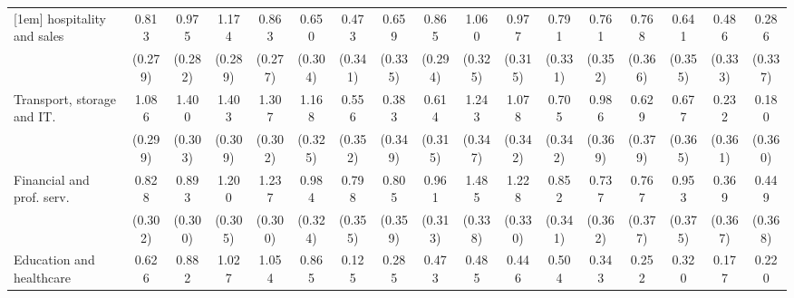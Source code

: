 {\begin{tabular}{l*{16}{c}}
[1em]
hospitality and sales&       0.813\sym{**} &       0.975\sym{***}&       1.174\sym{***}&       0.863\sym{**} &       0.650\sym{*}  &       0.473         &       0.659\sym{*}  &       0.865\sym{**} &       1.060\sym{**} &       0.977\sym{**} &       0.791\sym{*}  &       0.761\sym{*}  &       0.768\sym{*}  &       0.641         &       0.486         &       0.286         \\
                    &     (0.279)         &     (0.282)         &     (0.289)         &     (0.277)         &     (0.304)         &     (0.341)         &     (0.335)         &     (0.294)         &     (0.325)         &     (0.315)         &     (0.331)         &     (0.352)         &     (0.366)         &     (0.355)         &     (0.333)         &     (0.337)         \\
[1em]
Transport, storage and IT.&       1.086\sym{***}&       1.400\sym{***}&       1.403\sym{***}&       1.307\sym{***}&       1.168\sym{***}&       0.556         &       0.383         &       0.614         &       1.243\sym{***}&       1.078\sym{**} &       0.705\sym{*}  &       0.986\sym{**} &       0.629         &       0.677         &       0.232         &       0.180         \\
                    &     (0.299)         &     (0.303)         &     (0.309)         &     (0.302)         &     (0.325)         &     (0.352)         &     (0.349)         &     (0.315)         &     (0.347)         &     (0.342)         &     (0.342)         &     (0.369)         &     (0.379)         &     (0.365)         &     (0.361)         &     (0.360)         \\
[1em]
Financial and prof. serv.&       0.828\sym{**} &       0.893\sym{**} &       1.200\sym{***}&       1.237\sym{***}&       0.984\sym{**} &       0.798\sym{*}  &       0.805\sym{*}  &       0.961\sym{**} &       1.485\sym{***}&       1.228\sym{***}&       0.852\sym{*}  &       0.737\sym{*}  &       0.767\sym{*}  &       0.953\sym{*}  &       0.369         &       0.449         \\
                    &     (0.302)         &     (0.300)         &     (0.305)         &     (0.300)         &     (0.324)         &     (0.355)         &     (0.359)         &     (0.313)         &     (0.338)         &     (0.330)         &     (0.341)         &     (0.362)         &     (0.377)         &     (0.375)         &     (0.367)         &     (0.368)         \\
[1em]
Education and healthcare&       0.626         &       0.882\sym{**} &       1.027\sym{**} &       1.054\sym{**} &       0.865\sym{*}  &       0.125         &       0.285         &       0.473         &       0.485         &       0.446         &       0.504         &       0.343         &       0.252         &       0.320         &       0.177         &       0.220         \\

\end{tabular}}
